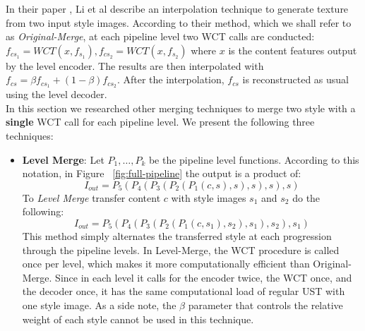 In their paper \cite{bib11}, Li et al describe an interpolation technique to generate texture from two input style images. According to their method, which we shall refer to as \textit{Original-Merge}, at each pipeline level two WCT calls are conducted: $f_{cs_1} = WCT(x, f_{s_1}), f_{cs_2} = WCT(x, f_{s_2})$ where $x$ is the content features output by the level encoder. The results are then interpolated with $f_{cs} = \beta f_{cs_1} + (1-\beta)f_{cs_2}$. After the interpolation, $f_{cs}$ is reconstructed as usual using the level decoder.\\

In this section we researched other merging techniques to merge two style with a \textbf{single} WCT call for each pipeline level. We present the following three techniques:

\begin{itemize}
	\item \textbf{Level Merge}: Let $P_1, \dots, P_k$ be the pipeline level functions. According to this notation, in Figure ~\ref{fig:full-pipeline} the output is a product of:
	\begin{equation*}
	I_{out} = P_5 ( P_4 ( P_3 ( P_2 ( P_1 (c,s),s) ,s),s), s)
	\end{equation*}
	To \textit{Level Merge} transfer content $c$ with style images $s_1$ and $s_2$ do the following:
	\begin{equation*}
	I_{out} = P_5 ( P_4 ( P_3 ( P_2 ( P_1 (c, s_1), s_2), s_1), s_2), s_1)
	\end{equation*}
	This method simply alternates the transferred style at each progression through the pipeline levels. In Level-Merge, the WCT procedure is called once per level, which makes it more computationally efficient than Original-Merge. Since in each level it calls for the encoder twice, the WCT once, and the decoder once, it has the same computational load of regular UST with one style image. As a side note, the $\beta$ parameter that controls the relative weight of each style cannot be used in this technique.
	 

\end{itemize}

